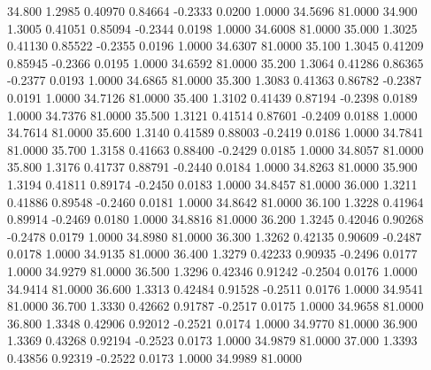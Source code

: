   34.800   1.2985   0.40970   0.84664  -0.2333   0.0200   1.0000  34.5696  81.0000
  34.900   1.3005   0.41051   0.85094  -0.2344   0.0198   1.0000  34.6008  81.0000
  35.000   1.3025   0.41130   0.85522  -0.2355   0.0196   1.0000  34.6307  81.0000
  35.100   1.3045   0.41209   0.85945  -0.2366   0.0195   1.0000  34.6592  81.0000
  35.200   1.3064   0.41286   0.86365  -0.2377   0.0193   1.0000  34.6865  81.0000
  35.300   1.3083   0.41363   0.86782  -0.2387   0.0191   1.0000  34.7126  81.0000
  35.400   1.3102   0.41439   0.87194  -0.2398   0.0189   1.0000  34.7376  81.0000
  35.500   1.3121   0.41514   0.87601  -0.2409   0.0188   1.0000  34.7614  81.0000
  35.600   1.3140   0.41589   0.88003  -0.2419   0.0186   1.0000  34.7841  81.0000
  35.700   1.3158   0.41663   0.88400  -0.2429   0.0185   1.0000  34.8057  81.0000
  35.800   1.3176   0.41737   0.88791  -0.2440   0.0184   1.0000  34.8263  81.0000
  35.900   1.3194   0.41811   0.89174  -0.2450   0.0183   1.0000  34.8457  81.0000
  36.000   1.3211   0.41886   0.89548  -0.2460   0.0181   1.0000  34.8642  81.0000
  36.100   1.3228   0.41964   0.89914  -0.2469   0.0180   1.0000  34.8816  81.0000
  36.200   1.3245   0.42046   0.90268  -0.2478   0.0179   1.0000  34.8980  81.0000
  36.300   1.3262   0.42135   0.90609  -0.2487   0.0178   1.0000  34.9135  81.0000
  36.400   1.3279   0.42233   0.90935  -0.2496   0.0177   1.0000  34.9279  81.0000
  36.500   1.3296   0.42346   0.91242  -0.2504   0.0176   1.0000  34.9414  81.0000
  36.600   1.3313   0.42484   0.91528  -0.2511   0.0176   1.0000  34.9541  81.0000
  36.700   1.3330   0.42662   0.91787  -0.2517   0.0175   1.0000  34.9658  81.0000
  36.800   1.3348   0.42906   0.92012  -0.2521   0.0174   1.0000  34.9770  81.0000
  36.900   1.3369   0.43268   0.92194  -0.2523   0.0173   1.0000  34.9879  81.0000
  37.000   1.3393   0.43856   0.92319  -0.2522   0.0173   1.0000  34.9989  81.0000

